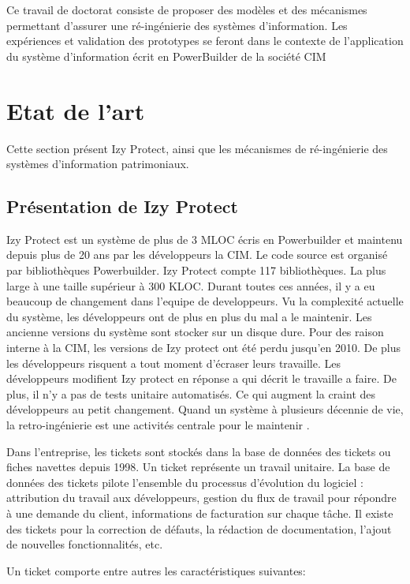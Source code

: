 \documentclass[a4paper]{article}
\begin{document}
Ce travail de doctorat consiste de proposer des modèles et des mécanismes permettant d'assurer
une ré-ingénierie des systèmes d'information. Les expériences et validation des prototypes se feront dans le contexte de l'application du système d'information écrit en PowerBuilder de la société CIM
\section{Etat de l'art}
\label{sec:stateOfTheArt}

Cette section présent Izy Protect, ainsi que les mécanismes de ré-ingénierie des systèmes d'information patrimoniaux.
\subsection{Présentation de Izy Protect}
\label{sec:izyProtect}
Izy Protect est un système de plus de 3 MLOC écris en Powerbuilder et maintenu depuis plus de 20 ans par les développeurs la CIM. Le code source est organisé par bibliothèques Powerbuilder. 
Izy Protect compte 117 bibliothèques. La plus large  à une taille supérieur à 300 KLOC.
Durant toutes ces années, il y a eu beaucoup de changement dans l'equipe de developpeurs.  
Vu la complexité actuelle du système, les développeurs ont de plus en plus du mal a le maintenir.
 Les ancienne versions du système sont stocker sur un disque dure. Pour des raison interne à la CIM, les versions de Izy protect ont été perdu jusqu'en 2010.  De plus les développeurs risquent a tout moment d'écraser leurs travaille. Les développeurs modifient Izy protect en réponse a qui décrit le travaille a faire. 
De plus, il n'y a pas de tests unitaire automatisés.
Ce qui augment la craint des développeurs au petit changement. 
Quand un système à plusieurs décennie de vie, la retro-ingénierie est une activités centrale pour le maintenir \cite{Deme02a}.

Dans l'entreprise, les tickets sont stockés dans la base de données des tickets ou fiches navettes depuis 1998. 
Un ticket représente un travail unitaire.
La base de données des tickets pilote l'ensemble du processus d'évolution du logiciel : attribution du travail aux développeurs, gestion du flux de travail pour répondre à une demande du client, informations de facturation sur chaque tâche.
Il existe des tickets pour la correction de défauts, la rédaction de documentation, l'ajout de nouvelles fonctionnalités, etc. 

Un ticket comporte entre autres les caractéristiques suivantes:
\end{document}

